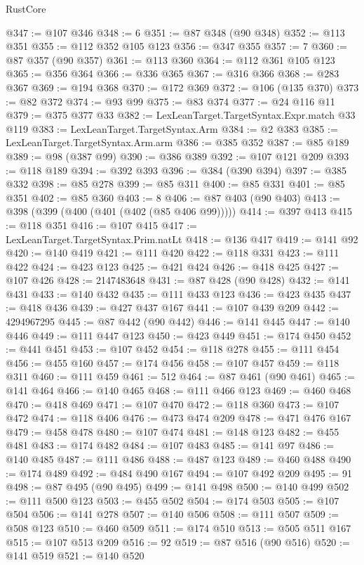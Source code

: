 \begin{lexlean}{RustCore}
\begin{coremodule}
@347 := @107 @346
@348 := 6
@351 := @87 @348 (@90 @348)
@352 := @113 @351
@355 := @112 @352 @105 @123
@356 := @347 @355
@357 := 7
@360 := @87 @357 (@90 @357)
@361 := @113 @360
@364 := @112 @361 @105 @123
@365 := @356 @364
@366 := @336 @365
@367 := @316 @366
@368 := @283 @367
@369 := @194 @368
@370 := @172 @369
@372 := @106 (@135 @370)
@373 := @82 @372
@374 := @93 @99
@375 := @83 @374
@377 := @24 @116 @11
@379 := @375 @377 @33
@382 := LexLeanTarget.TargetSyntax.Expr.match @33 @119
@383 := LexLeanTarget.TargetSyntax.Arm
@384 := @2 @383
@385 := LexLeanTarget.TargetSyntax.Arm.arm
@386 := @385 @352
@387 := @85 @189
@389 := @98 (@387 @99)
@390 := @386 @389
@392 := @107 @121 @209
@393 := @118 @189
@394 := @392 @393
@396 := @384 (@390 @394)
@397 := @385 @332
@398 := @85 @278
@399 := @85 @311
@400 := @85 @331
@401 := @85 @351
@402 := @85 @360
@403 := 8
@406 := @87 @403 (@90 @403)
@413 := @398 (@399 (@400 (@401 (@402 (@85 @406 @99)))))
@414 := @397 @413
@415 := @118 @351
@416 := @107 @415
@417 := LexLeanTarget.TargetSyntax.Prim.natLt
@418 := @136 @417
@419 := @141 @92
@420 := @140 @419
@421 := @111 @420
@422 := @118 @331
@423 := @111 @422
@424 := @423 @123
@425 := @421 @424
@426 := @418 @425
@427 := @107 @426
@428 := 2147483648
@431 := @87 @428 (@90 @428)
@432 := @141 @431
@433 := @140 @432
@435 := @111 @433 @123
@436 := @423 @435
@437 := @418 @436
@439 := @427 @437 @167
@441 := @107 @439 @209
@442 := 4294967295
@445 := @87 @442 (@90 @442)
@446 := @141 @445
@447 := @140 @446
@449 := @111 @447 @123
@450 := @423 @449
@451 := @174 @450
@452 := @441 @451
@453 := @107 @452
@454 := @118 @278
@455 := @111 @454
@456 := @455 @160
@457 := @174 @456
@458 := @107 @457
@459 := @118 @311
@460 := @111 @459
@461 := 512
@464 := @87 @461 (@90 @461)
@465 := @141 @464
@466 := @140 @465
@468 := @111 @466 @123
@469 := @460 @468
@470 := @418 @469
@471 := @107 @470
@472 := @118 @360
@473 := @107 @472
@474 := @118 @406
@476 := @473 @474 @209
@478 := @471 @476 @167
@479 := @458 @478
@480 := @107 @474
@481 := @148 @123
@482 := @455 @481
@483 := @174 @482
@484 := @107 @483
@485 := @141 @97
@486 := @140 @485
@487 := @111 @486
@488 := @487 @123
@489 := @460 @488
@490 := @174 @489
@492 := @484 @490 @167
@494 := @107 @492 @209
@495 := 91
@498 := @87 @495 (@90 @495)
@499 := @141 @498
@500 := @140 @499
@502 := @111 @500 @123
@503 := @455 @502
@504 := @174 @503
@505 := @107 @504
@506 := @141 @278
@507 := @140 @506
@508 := @111 @507
@509 := @508 @123
@510 := @460 @509
@511 := @174 @510
@513 := @505 @511 @167
@515 := @107 @513 @209
@516 := 92
@519 := @87 @516 (@90 @516)
@520 := @141 @519
@521 := @140 @520

\end{coremodule}
\end{lexlean}
